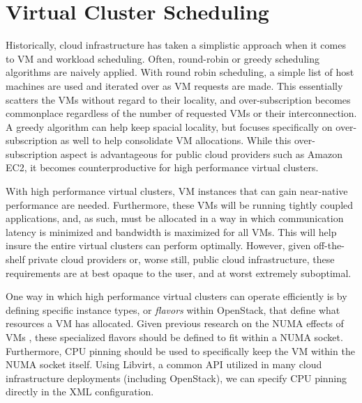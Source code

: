 \section{Virtual Cluster Scheduling}
\label{vcsched}


Historically, cloud infrastructure has taken a simplistic approach when it comes to VM and workload scheduling. Often, round-robin or greedy \cite{Younge2011eagc} scheduling algorithms are naively applied. With round robin scheduling, a simple list of host machines are used and iterated over as VM requests are made. This essentially scatters the VMs without regard to their locality, and over-subscription becomes commonplace regardless of the number of requested VMs or their interconnection. A greedy algorithm can help keep spacial locality, but focuses specifically on over-subscription as well to help consolidate VM allocations. While this over-subscription aspect is advantageous for public cloud providers such as Amazon EC2, it becomes counterproductive for high performance virtual clusters.

With high performance virtual clusters, VM instances that can gain near-native performance are needed. Furthermore, these VMs will be running tightly coupled applications, and, as such, must be allocated in a way in which communication latency is minimized and bandwidth is maximized for all VMs. This will help insure the entire virtual clusters can perform optimally.  However, given off-the-shelf private cloud providers or, worse still, public cloud infrastructure, these requirements are at best opaque to the user, and at worst extremely suboptimal.

One way in which high performance virtual clusters can operate efficiently is by defining specific instance types, or \emph{flavors} within OpenStack, that define what resources a VM has allocated.  Given previous research on the NUMA effects of VMs \cite{openstack-numa}, these specialized flavors should be defined to fit within a NUMA socket.  Furthermore, CPU pinning should be used to specifically keep the VM within the NUMA socket itself.  Using Libvirt, a common API utilized in many cloud infrastructure deployments (including OpenStack), we can specify CPU pinning directly in the XML configuration.


